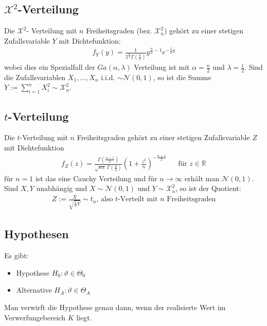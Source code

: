 \documentclass[8pt]{extarticle}
\newcommand{\R}{\mathbb{R}}
\newcommand{\X}{\mathcal{X}}
\newcommand{\vt}{\vartheta}
\newcommand{\ra}{\rightarrow}
\newcommand{\Sn}{\sum_{i = 1}^n}
\newcommand{\zufallsvariablen}{X_1, \dots, X_n}
\newcommand{\Standardnormalverteilt}{\mathcal{N}(0, 1)}
\begin{document}
\begin{multicols*}{3}
  \subsection*{$\X^2$-Verteilung}
  Die $\X^2$- Verteilung mit $n$ Freiheitsgraden (bez. $\X^2_n$) gehört zu einer
  stetigen Zufallsvariable $Y$ mit Dichtefunktion:
  \begin{align*}
    f_Y(y) = \frac{1}{2^{\frac{n}{2}}  \Gamma(\frac{n}{2})} y^{\frac{n}{2} - 1} e^{-\frac{1}{2} y}
  \end{align*}
  wobei dies ein Spezialfall der $Ga(\alpha, \lambda)$ Verteilung ist mit
  $\alpha = \frac{n}{2}$ und $\lambda = \frac{1}{2}$. Sind die Zufallsvariablen
  $\zufallsvariablen$ i.i.d. $\sim \Standardnormalverteilt$, so ist die Summe
  $Y := \Sn X_i^2 \sim \X^2_n$.
  \subsection*{$t$-Verteilung}
  Die $t$-Verteilung mit $n$ Freiheitsgraden gehört zu einer stetigen Zufallsvariable
  $Z$ mit Dichtefunktion
  \begin{align*}
    f_Z(z) = \frac{\Gamma(\frac{n+1}{2})}{\sqrt{n \pi} \, \Gamma(\frac{n}{2})} \left( 1 + \frac{z^2}{n} \right)^{-\frac{n+1}{2}}
     &  & \text{für } z \in \R
  \end{align*}
  für $n = 1$ ist das eine Cauchy Verteilung und für $n \ra \infty$ erhält man
  $\Standardnormalverteilt$. Sind $X, Y$ unabhängig und $X \sim \Standardnormalverteilt$
  und $Y \sim \X^2_n$, so ist der Quotient:
  \begin{align*}
    Z := \frac{X}{\sqrt{\frac{1}{n} Y}} \sim t_n \text{, also $t$-Verteilt mit $n$ Freiheitsgraden}
  \end{align*}
  \subsection*{Hypothesen}
  Es gibt:
  \begin{itemize}
    \item Hypothese $H_0 : \vt \in \varTheta_0$
    \item Alternative $H_A : \vt \in \varTheta_A$
  \end{itemize}
  Man verwirft die Hypothese genau dann, wenn der realisierte Wert im
  Verwerfungebereich $K$ liegt.

\end{multicols*}
\end{document}
